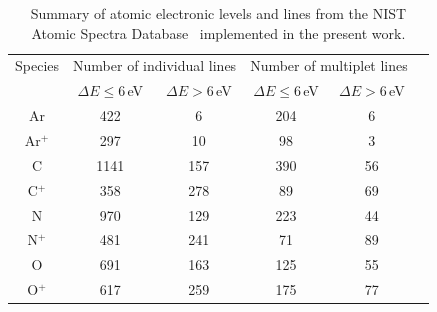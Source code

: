 \begin{table}[h]
 \center
 \caption{Summary of atomic electronic levels and lines from the NIST Atomic Spectra Database~\cite{NIST_ASD} implemented in the present work.}
 \label{tab:atomic-lines}
 \begin{tabular*}{0.8\textwidth}{cccccc}
  \hline Species                          & \multicolumn{2}{c}{Number of individual lines}                                  & \multicolumn{2}{c}{Number of multiplet lines}      \\
                                                      &$\Delta E \leq 6$\,eV & $\Delta E > 6$\,eV                                           & $\Delta E \leq 6$\,eV & $\Delta E > 6$\,eV \\
  \hline  
                  Ar                               &  422                             &  6                                      &   204                            &    6                          \\
                  Ar$^+$                      &   297                            & 10                                    &   98                               &    3                         \\
                  C                                & 1141                            & 157                                 &  390                              &    56                       \\
                  C$^+$                       &   358                             & 278                                 &  89                                 &    69                       \\
                  N                                &    970                            & 129                                 & 223                                &    44                       \\      
                  N$^+$                       &    481                            & 241                                 & 71                                   & 89                        \\
                  O                               &     691                            & 163                                 & 125                                &  55                        \\
                  O$^+$                      &    617                             &  259                               & 175                                 & 77                         \\            
  \hline
 \end{tabular*}
\end{table}

